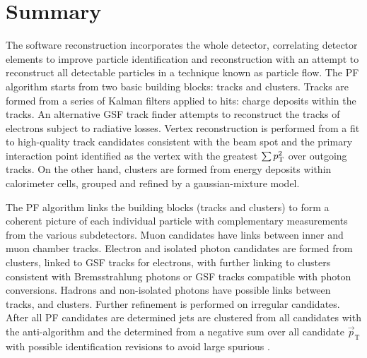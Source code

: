 \section{Summary}

The \CMS software reconstruction incorporates the whole detector, correlating
detector elements to improve particle identification and reconstruction with an
attempt to reconstruct all detectable particles in a technique known as
particle flow. The PF algorithm starts from two basic building blocks: tracks
and clusters. Tracks are formed from a series of Kalman filters applied to
hits: charge deposits within the tracks. An alternative GSF track finder
attempts to reconstruct the tracks of electrons subject to radiative losses.
Vertex reconstruction is performed from a fit to high-quality track candidates
consistent with the beam spot and the primary interaction point identified as
the vertex with the greatest $\sum p_{\text{T}}^2$ over outgoing tracks. On the other
hand, clusters are formed from energy deposits within calorimeter cells,
grouped and refined by a gaussian-mixture model. 

The PF algorithm links the building blocks (tracks and clusters) to form a
coherent picture of each individual particle with complementary measurements
from the various subdetectors. Muon candidates have links between inner and
muon chamber tracks. Electron and isolated photon candidates are formed from
\ECAL clusters, linked to GSF tracks for electrons, with further linking to
clusters consistent with Bremsstrahlung photons or GSF tracks compatible with
photon conversions. Hadrons and non-isolated photons have possible links
between tracks, \HCAL and \ECAL clusters. Further refinement is performed on
irregular candidates. After all PF candidates are determined jets are
clustered from all candidates with the anti-\kt algorithm and the \ptmiss
determined from a negative sum over all candidate $\vec{p}_{\mathrm{T}}$
with possible identification revisions to avoid large spurious
\ptmiss.
